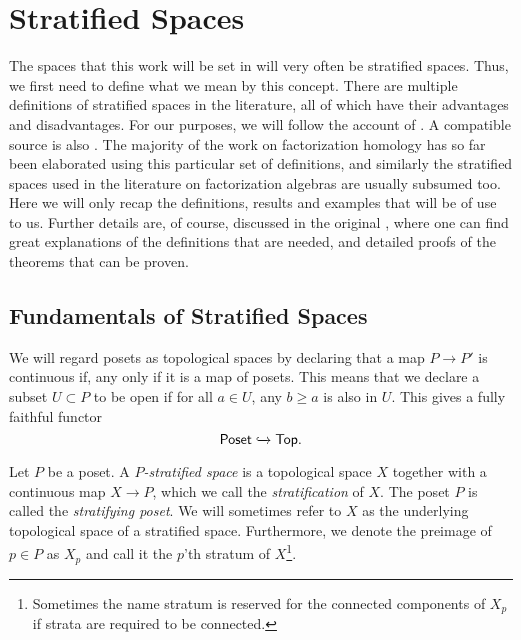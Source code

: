 \documentclass[../text]{subfiles}
\begin{document}
\section{Stratified Spaces}\label{ch:strat_spaces}

The spaces that this work will be set in will very often be stratified spaces. Thus, we first need to define what we mean by this concept. There are multiple definitions of stratified spaces in the literature, all of which have their advantages and disadvantages. For our purposes, we will follow the account of \cite{aft_localstrut}. A compatible source is also \cite[sec.A.5]{lurie_ha}. The majority of the work on factorization homology has so far been elaborated using this particular set of definitions, and similarly the stratified spaces used in the literature on factorization algebras are usually subsumed too. Here we will only recap the definitions, results and examples that will be of use to us. Further details are, of course, discussed in the original \cite{aft_localstrut}, where one can find great explanations of the definitions that are needed, and detailed proofs of the theorems that can be proven.

\subsection{Fundamentals of Stratified Spaces}

\begin{definition}
    We will regard posets as topological spaces by declaring that a map $P \rightarrow P'$ is continuous if, any only if it is a map of posets. This means that we declare a subset $U \subset P$ to be open if for all $a \in U$, any $b \geq a$ is also in $U$. This gives a fully faithful functor
    \begin{equation}
        \mathsf{Poset} \xhookrightarrow{} \mathsf{Top}.
    \end{equation} 
\end{definition}

\begin{definition}
    Let $P$ be a poset. A \emph{$P$-stratified space} is a topological space $X$ together with a continuous map $X \rightarrow P$, which we call the \emph{stratification} of $X$. The poset $P$ is called the \emph{stratifying poset}. We will sometimes refer to $X$ as the underlying topological space of a stratified space. Furthermore, we denote the preimage of $p \in P$ as $X_p$ and call it the $p$'th stratum of $X$\footnote{Sometimes the name stratum is reserved for the connected components of $X_p$ if strata are required to be connected.}.
\end{definition}
\end{document}
